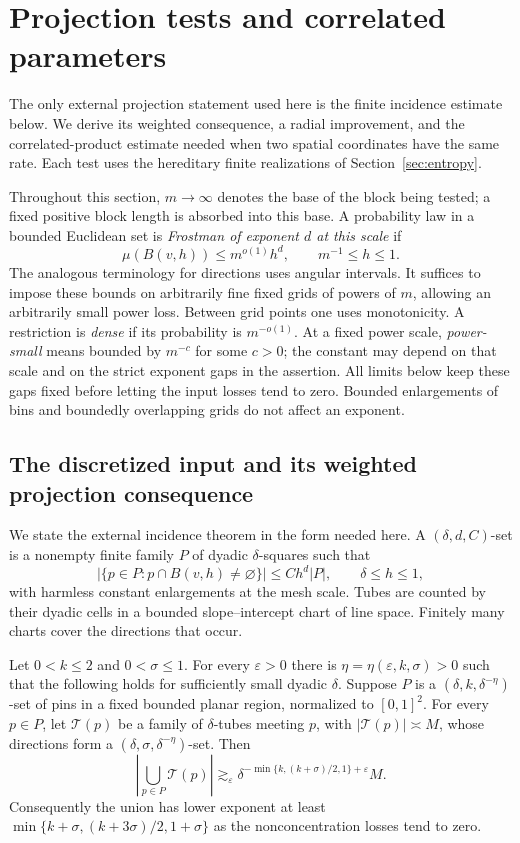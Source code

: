 \section{Projection tests and correlated parameters}
\label{sec:projection}

The only external projection statement used here is the finite
incidence estimate below.  We derive its weighted consequence, a
radial improvement, and the correlated-product estimate needed when
two spatial coordinates have the same rate.  Each test uses the
hereditary finite realizations of Section~\ref{sec:entropy}.

Throughout
this section, $m\to\infty$ denotes the base of the block being tested; a
fixed positive block length is absorbed into this base. A probability law
in a bounded Euclidean set is \emph{Frostman of exponent $d$ at this
scale} if
\[
 \mu(B(v,h))\le m^{o(1)}h^d,\qquad m^{-1}\le h\le 1.
\]
The analogous terminology for directions uses angular intervals. It
suffices to impose these bounds on arbitrarily fine fixed grids of powers
of $m$, allowing an arbitrarily small power loss. Between grid points one
uses monotonicity. A restriction is \emph{dense} if its probability is
$m^{-o(1)}$. At a fixed power scale, \emph{power-small} means bounded by
$m^{-c}$ for some $c>0$; the constant may depend on that scale and on the
strict exponent gaps in the assertion. All limits below keep these gaps
fixed before letting the input losses tend to zero. Bounded enlargements
of bins and boundedly overlapping grids do not affect an exponent.

\subsection{The discretized input and its weighted projection consequence}

We state the external incidence theorem in the form needed here. A
$(\delta,d,C)$-set is a nonempty finite family $P$ of dyadic $\delta$-squares such
that
\[
 |\{p\in P:p\cap B(v,h)\ne\varnothing\}|
 \le C h^d |P|,\qquad \delta\le h\le 1,
\]
with harmless constant enlargements at the mesh scale. Tubes are counted
by their dyadic cells in a bounded slope--intercept chart of line space.
Finitely many charts cover the directions that occur.

\begin{theorem}
\label{proj:furstenberg}
Let $0<k\le2$ and $0<\sigma\le1$. For every $\varepsilon>0$ there is
$\eta=\eta(\varepsilon,k,\sigma)>0$ such that the following holds for
sufficiently small dyadic $\delta$. Suppose $P$ is a
$(\delta,k,\delta^{-\eta})$-set of pins in a fixed bounded planar
region, normalized to $[0,1]^2$. For every $p\in P$, let
$\mathcal T(p)$ be a family of $\delta$-tubes meeting $p$, with
$|\mathcal T(p)|\asymp M$, whose directions form a
$(\delta,\sigma,\delta^{-\eta})$-set. Then
\[
 \left|\bigcup_{p\in P}\mathcal T(p)\right|
 \gtrsim_{\varepsilon}
 \delta^{-\min\{k,(k+\sigma)/2,1\}+\varepsilon}M.
\]
Consequently the union has lower exponent at least
$\min\{k+\sigma,(k+3\sigma)/2,1+\sigma\}$ as the nonconcentration
losses tend to zero.
\end{theorem}

